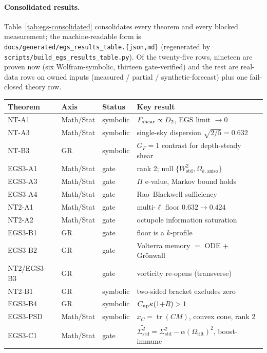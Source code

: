 \documentclass[11pt,a4paper]{article}
\newcommand{\xC}{x_{C}}
\newcommand{\Sigstd}{\Sigma^{2}_{\mathrm{std}}}
\newcommand{\Wstd}{W^{2}_{\mathrm{std}}}
\newcommand{\Otilt}{\Omega_{\mathrm{tilt}}}
\newcommand{\Okaniso}{\Omega_{k,\mathrm{aniso}}}
\theoremstyle{plain}
\theoremstyle{definition}
\begin{document}
\paragraph{Consolidated results.}
Table~\ref{tab:egs-consolidated} consolidates every theorem and every blocked
measurement; the machine-readable form is
\texttt{docs/generated/egs\_results\_table.\{json,md\}} (regenerated by
\texttt{scripts/build\_egs\_results\_table.py}). Of the twenty-five rows, nineteen
are proven now (six Wolfram-symbolic, thirteen gate-verified) and the rest are
real-data rows on owned inputs (measured / partial / synthetic-forecast) plus one
fail-closed theory row.

\begin{table}[htbp]
  \centering
  \small
  \begin{tabular}{@{}llll@{}}
    \toprule
    Theorem & Axis & Status & Key result \\
    \midrule
    NT-A1 & Math/Stat & symbolic & $F_{\rm shear}\propto D_2$, EGS limit $\to0$ \\
    NT-A3 & Math/Stat & symbolic & single-sky dispersion $\sqrt{2/5}=0.632$ \\
    NT-B3 & GR & symbolic & $G_F=1$ contrast for depth-steady shear \\
    EGS3-A1 & Math/Stat & gate & rank 2; null $\{\Wstd,\Okaniso\}$ \\
    EGS3-A3 & Math/Stat & gate & $\Pi$ e-value, Markov bound holds \\
    EGS3-A4 & Math/Stat & gate & Rao--Blackwell sufficiency \\
    NT2-A1 & Math/Stat & gate & multi-$\ell$ floor $0.632\!\to\!0.424$ \\
    NT2-A2 & Math/Stat & gate & octupole information saturation \\
    EGS3-B1 & GR & gate & floor is a $k$-profile \\
    EGS3-B2 & GR & gate & Volterra memory $=$ ODE $+$ Grönwall \\
    NT2/EGS3-B3 & GR & gate & vorticity re-opens (transverse) \\
    NT2-B1 & GR & symbolic & two-sided bracket excludes zero \\
    EGS3-B4 & GR & symbolic & $C_{\rm up}\kappa(1{+}R)>1$ \\
    EGS3-PSD & Math/Stat & symbolic & $\xC=\operatorname{tr}(CM)$, convex cone, rank 2 \\
    EGS3-C1 & Math/Stat & gate & $\widetilde{\Sigstd}=\Sigstd-\alpha(\Otilt)^2$, boost-immune \\

\end{tabular}
\end{table}
\end{document}

